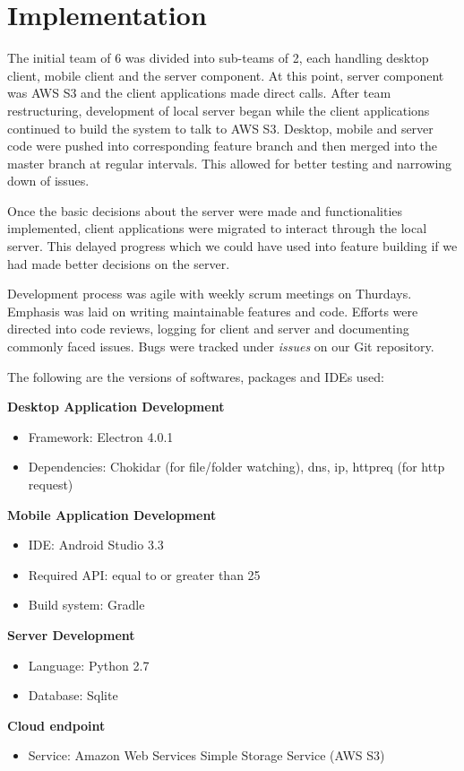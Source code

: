 \section{Implementation}

The initial team of 6 was divided into sub-teams of 2, each handling desktop client, mobile client and the server component. At this point, server component was AWS S3 and the client applications made direct calls. After team restructuring, development of local server began while the client applications continued to build the system to talk to AWS S3. Desktop, mobile and server code were pushed into corresponding feature branch and then merged into the master branch at regular intervals. This allowed for better testing and narrowing down of issues.\newline

Once the basic decisions about the server were made and functionalities implemented, client applications were migrated to interact through the local server. This delayed progress which we could have used into feature building if we had made better decisions on the server.\newline

Development process was agile with weekly scrum meetings on Thurdays. Emphasis was laid on writing maintainable features and code. Efforts were directed into code reviews, logging for client and server and documenting commonly faced issues. Bugs were tracked under \emph{issues} on our Git repository.\newline

The following are the versions of softwares, packages and IDEs used:\newline

\textbf{Desktop Application Development}
\begin{itemize}
	\item Framework: Electron 4.0.1
	\item Dependencies: Chokidar (for file/folder watching), dns, ip, httpreq (for http request)\newline
\end{itemize}

\textbf{Mobile Application Development}
\begin{itemize}
	\item IDE: Android Studio 3.3
	\item Required API: equal to or greater than 25
	\item Build system: Gradle\newline
\end{itemize}

\textbf{Server Development}
\begin{itemize}
	\item Language: Python 2.7
	\item Database: Sqlite\newline
\end{itemize}

\textbf{Cloud endpoint}
\begin{itemize}
	\item Service: Amazon Web Services Simple Storage Service (AWS S3)\newline
\end{itemize}